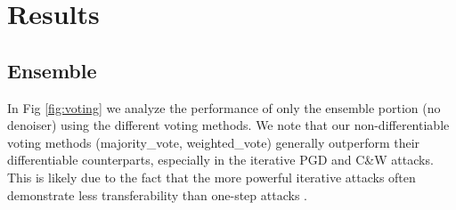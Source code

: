 \documentclass[10pt,journal,compsoc]{IEEEtran}
\begin{document}
\section{Results}
\subsection{Ensemble}
In Fig \ref{fig:voting} we analyze the performance of only the ensemble portion (no denoiser) using the different voting methods. We note that our non-differentiable voting methods (majority\_vote, weighted\_vote) generally outperform their differentiable counterparts, especially in the iterative PGD and C\&W attacks. This is likely due to the fact that the more powerful iterative attacks often demonstrate less transferability than one-step attacks \cite{eat}.
\end{document}
